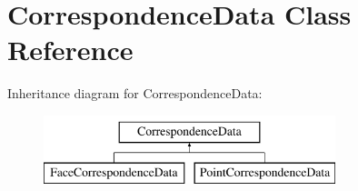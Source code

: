 \hypertarget{class_correspondence_data}{}\section{Correspondence\+Data Class Reference}
\label{class_correspondence_data}
Inheritance diagram for Correspondence\+Data\+:\begin{figure}[H]
\begin{center}
\leavevmode
\includegraphics[height=2.000000cm]{class_correspondence_data}
\end{center}
\end{figure}
